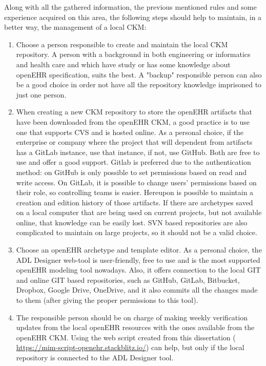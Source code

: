 \documentclass[mim_thesis.tex]{subfiles}
\begin{document}
Along with all the gathered information, the previous mentioned rules and some experience acquired on this area, the following steps should help to maintain, in a better way, the management of a local CKM: 
\begin{enumerate}
\item Choose a person responsible to create and maintain the local CKM repository. A person with a background in both engineering or informatics and health care and which have study or has some knowledge about openEHR specification, suits the best. A "backup" responsible person can also be a good choice in order not have all the repository knowledge imprisoned to just one person.
\item When creating a new CKM repository to store the openEHR artifacts that have been downloaded from the openEHR CKM, a good practice is to use one that supports \ac{CVS} and is hosted online. As a personal choice, if the enterprise or company where the project that will dependent from artifacts has a GitLab instance, use that instance, if not, use GitHub. Both are free to use and offer a good support. Gitlab is preferred due to the authentication method: on GitHub is only possible to set permissions based on read and write access. On GitLab, it is possible to change users’ permissions based on their role, so controlling teams is easier. Hereupon is possible to maintain a creation and edition history of those artifacts. If there are archetypes saved on a local computer that are being used on current projects, but not available online, that knowledge can be easily lost. \ac{SVN} based repositories are also complicated to maintain on large projects, so it should not be a valid choice. 
\item Choose an openEHR archetype and template editor. As a personal choice, the ADL Designer web-tool is user-friendly, free to use and is the most supported openEHR modeling tool  nowadays. Also, it offers connection to the local GIT and online GIT based repositories, such as GitHub, GitLab, Bitbucket, Dropbox, Google Drive, OneDrive,  and it also commits all the changes made to them (after giving the proper permissions to this tool).  
\item The responsible person should be on charge of making weekly verification updates from the local openEHR resources with the ones available from the openEHR CKM. Using the web script created from this dissertation (\url{ https://mim-script-openehr.stackblitz.io/}) can help, but only if the local repository is connected to the ADL Designer tool. 

\end{enumerate}
\end{document}
